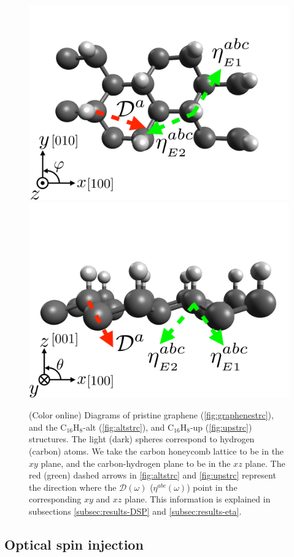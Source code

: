 \documentclass[pss]{wiley2sp} %
\begin{document}
\begin{figure}[t]
{\includegraphics[width=0.49\linewidth]{figures/images/up1}
\includegraphics[width=0.49\linewidth]{figures/images/up2}\label{fig:upstrc}}
\caption{(Color online) Diagrams of pristine graphene
(\ref{fig:graphenestrc}), and the C$_{16}$H$_{8}$-alt (\ref{fig:altstrc}), and
C$_{16}$H$_{8}$-up (\ref{fig:upstrc}) structures. The light (dark) spheres
correspond to hydrogen (carbon) atoms. We take the carbon honeycomb lattice to 
be in the $xy$ plane, and the carbon-hydrogen plane to be in the $xz$
plane. The red (green) dashed arrows in \ref{fig:altstrc} and \ref{fig:upstrc}
represent the direction where the $\mathcal{D}(\omega)$
($\eta^{abc}(\omega)$) point in the corresponding $xy$ and $xz$ plane. This
information is explained in subsections \ref{subsec:results-DSP} and
\ref{subsec:results-eta}. \label{fig:structures}}
\end{figure}



\subsection{Optical spin injection}
\end{document}
